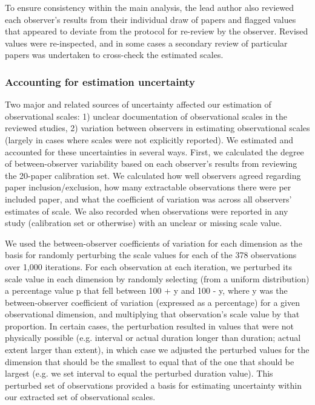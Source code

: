 \documentclass[12pt]{article}
\begin{document}
To ensure consistency within the main analysis, the lead author also reviewed each observer's results from their individual draw of papers and flagged values that appeared to deviate from the protocol for re-review by the observer. Revised values were re-inspected, and in some cases a secondary review of particular papers was undertaken to cross-check the estimated scales.   

\subsubsection*{Accounting for estimation uncertainty}
\vspace{-10pt}
Two major and related sources of uncertainty affected our estimation of observational scales: 1) unclear documentation of observational scales in the reviewed studies, 2) variation between observers in estimating observational scales (largely in cases where scales were not explicitly reported). We estimated and accounted for these uncertainties in several ways. First, we calculated the degree of between-observer variability based on each observer's results from reviewing the 20-paper calibration set. We calculated how well observers agreed regarding paper inclusion/exclusion, how many extractable observations there were per included paper, and what the coefficient of variation was across all observers' estimates of scale. We also recorded when observations were reported in any study (calibration set or otherwise) with an unclear or missing scale value. 

We used the between-observer coefficients of variation for each dimension as the basis for randomly perturbing the scale values for each of the 378 observations over 1,000 iterations. For each observation at each iteration, we perturbed its scale value in each dimension by randomly selecting (from a uniform distribution) a percentage value p that fell between 100 + y and 100 - y, where y was the between-observer coefficient of variation (expressed as a percentage) for a given observational dimension, and multiplying that observation's scale value by that proportion. In certain cases, the perturbation resulted in values that were not physically possible (e.g. interval or actual duration longer than duration; actual extent larger than extent), in which case we adjusted the perturbed values for the dimension that should be the smallest to equal that of the one that should be largest (e.g. we set interval to equal the perturbed duration value). This perturbed set of observations provided a basis for estimating uncertainty within our extracted set of observational scales. 
\end{document}
